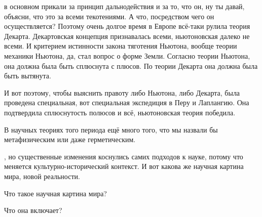 
в основном
прикали за принцип дальнодействия и за то, что он, ну ты давай, объясни, что это
за всеми текотениями. А что, посредством чего он осуществляется? Поэтому очень
долгое время в Европе всё-таки рулила теория Декарта. Декартовская концепция
признавалась всеми, ньютоновская далеко не всеми. И критерием истинности закона
тяготения Ньютона, вообще теории механики Ньютона, да, стал вопрос о форме
Земли. Согласно теории Ньютона, она должна была быть сплюснута с плюсов. По
теории Декарта она должна была быть вытянута.

И вот поэтому, чтобы выяснить правоту либо Ньютона, либо Декарта,
была проведена специальная, вот специальная экспедиция в Перу и Лаплангию. Она
подтвердила сплюснутость полюсов и всё, ньютоновская теория победила. 

 В научных теориях того периода ещё много того, что мы назвали бы
метафизическим или даже герметическим. 


, но существенные изменения коснулись самих подходов к науке, потому
что меняется культурно-исторический контекст. И вот какова же научная картина
мира, новой реальности. 

Что такое научная картина мира? 


Что она включает? 

